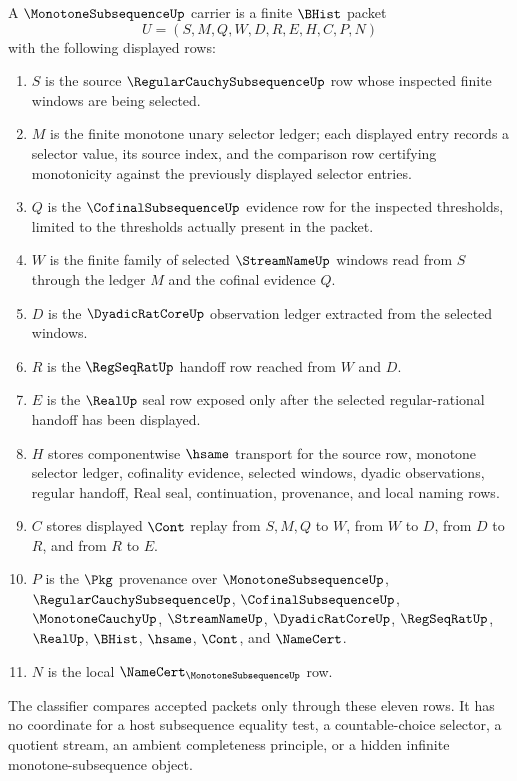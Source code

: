 \begin{definition}
\label{def:monotone-subsequence-carrier}
A $\MonotoneSubsequenceUp$ carrier is a finite $\BHist$ packet
$$
U=(S,M,Q,W,D,R,E,H,C,P,N)
$$
with the following displayed rows:
\begin{enumerate}
\item $S$ is the source $\RegularCauchySubsequenceUp$ row whose inspected finite windows are being selected.
\item $M$ is the finite monotone unary selector ledger; each displayed entry records a selector value, its source index, and the comparison row certifying monotonicity against the previously displayed selector entries.
\item $Q$ is the $\CofinalSubsequenceUp$ evidence row for the inspected thresholds, limited to the thresholds actually present in the packet.
\item $W$ is the finite family of selected $\StreamNameUp$ windows read from $S$ through the ledger $M$ and the cofinal evidence $Q$.
\item $D$ is the $\DyadicRatCoreUp$ observation ledger extracted from the selected windows.
\item $R$ is the $\RegSeqRatUp$ handoff row reached from $W$ and $D$.
\item $E$ is the $\RealUp$ seal row exposed only after the selected regular-rational handoff has been displayed.
\item $H$ stores componentwise $\hsame$ transport for the source row, monotone selector ledger, cofinality evidence, selected windows, dyadic observations, regular handoff, Real seal, continuation, provenance, and local naming rows.
\item $C$ stores displayed $\Cont$ replay from $S,M,Q$ to $W$, from $W$ to $D$, from $D$ to $R$, and from $R$ to $E$.
\item $P$ is the $\Pkg$ provenance over $\MonotoneSubsequenceUp$, $\RegularCauchySubsequenceUp$, $\CofinalSubsequenceUp$, $\MonotoneCauchyUp$, $\StreamNameUp$, $\DyadicRatCoreUp$, $\RegSeqRatUp$, $\RealUp$, $\BHist$, $\hsame$, $\Cont$, and $\NameCert$.
\item $N$ is the local $\NameCert_{\MonotoneSubsequenceUp}$ row.
\end{enumerate}
The classifier compares accepted packets only through these eleven rows. It has no coordinate for a host subsequence equality test, a countable-choice selector, a quotient stream, an ambient completeness principle, or a hidden infinite monotone-subsequence object.
\end{definition}

